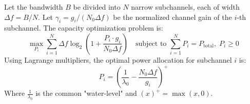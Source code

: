\documentclass[12pt,a4paper]{article}
\begin{document}
Let the bandwidth $B$ be divided into $N$ narrow subchannels, each of width $\Delta f = B/N$. Let $\gamma_i = g_i / (N_0 \Delta f)$ be the normalized channel gain of the $i$-th subchannel. The capacity optimization problem is:
\begin{equation}
  \max_{P_i} \sum_{i=1}^{N} \Delta f \log_2\left(1 + \frac{P_i \cdot g_i}{N_0 \Delta f}\right) \quad \text{subject to } \sum_{i=1}^{N} P_i = P_{\text{total}}, \; P_i \ge 0
\end{equation}
Using Lagrange multipliers, the optimal power allocation for subchannel $i$ is:
\begin{equation}
  P_i = \left( \frac{1}{\lambda_0} - \frac{N_0 \Delta f}{g_i} \right)^{\!+}
\end{equation}
Where $\frac{1}{\lambda_0}$ is the common "water-level" and $(x)^+ = \max(x, 0)$.
\end{document}
